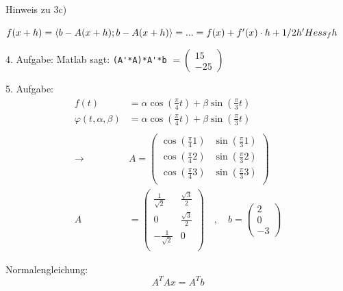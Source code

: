 Hinweis zu 3c)

$f(x+h) = \left\langle b-A(x+h);b-A(x+h)\right\rangle = ... = f(x) + f'(x) \cdot h + 1/2 h' Hess_f h$



4. Aufgabe:
Matlab sagt:
\lstinline{(A'*A)*A'*b} \quad$ = \begin{pmatrix*}15\\-25\end{pmatrix*}$


5. Aufgabe:
\begin{equation}\begin{split}
f(t) &= \alpha \cos\left(\frac{\pi}{4}t\right) + \beta \sin\left(\frac{\pi}{3}t\right) \\
\varphi(t, \alpha, \beta) &= \alpha \cos\left(\frac{\pi}{4}t\right) + \beta \sin\left(\frac{\pi}{3}t\right)\\\\
\rightarrow & 
A = 
\begin{pmatrix*}
\cos\left(\frac{\pi}{4}1\right) & \sin\left(\frac{\pi}{3}1\right)\\
\cos\left(\frac{\pi}{4}2\right) & \sin\left(\frac{\pi}{3}2\right)\\
\cos\left(\frac{\pi}{4}3\right) & \sin\left(\frac{\pi}{3}3\right)\\		
\end{pmatrix*}\\
A &= 
\begin{pmatrix*}
\frac{1}{\sqrt{2}}  & \frac{\sqrt{3}}{2}\\
0                   & \frac{\sqrt{3}}{2}\\
-\frac{1}{\sqrt{2}} & 0\\		
\end{pmatrix*}
\quad, \quad
b = 
\begin{pmatrix*}
2\\
0\\
-3
\end{pmatrix*}
\end{split}\end{equation}

Normalengleichung:
\[
	A^T A x = A^T b
\]

